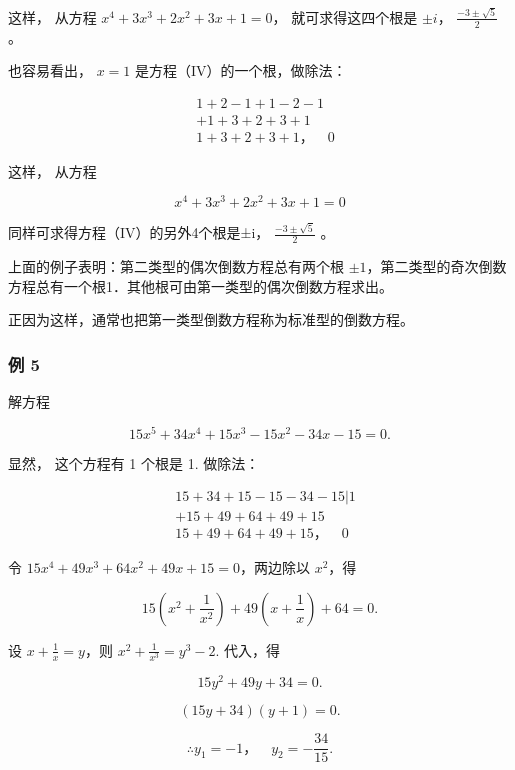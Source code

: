 这样， 从方程 \(x^{4} + 3x^{3} + 2x^{2} + 3x + 1 = 0\)，
就可求得这四个根是 \(\pm i\)， \(\frac{-3 \pm \sqrt{5}}{2}\)。

也容易看出， \(x = 1\) 是方程（IV）的一个根，做除法：

\[
\begin{array}{rl} & 1 + 2 - 1 + 1 - 2 - 1 \\ & + 1 + 3 + 2 + 3 + 1 \\ \hline {} & 1 + 3 + 2 + 3 + 1\text{，} \quad 0 \end{array}
\]

这样， 从方程

\[
x ^ {4} + 3 x ^ {3} + 2 x ^ {2} + 3 x + 1 = 0
\]

同样可求得方程（IV）的另外4个根是±i， \(\frac{-3\pm\sqrt{5}}{2}\) 。

上面的例子表明：第二类型的偶次倒数方程总有两个根
\(\pm 1\)，第二类型的奇次倒数方程总有一个根1．其他根可由第一类型的偶次倒数方程求出。

正因为这样，通常也把第一类型倒数方程称为标准型的倒数方程。

\subsubsection{例 5}

解方程

\[
15 x ^ {5} + 34 x ^ {4} + 15 x ^ {3} - 15 x ^ {2} - 34 x - 15 = 0.
\]

 显然， 这个方程有 1 个根是 1. 做除法：

\[
\begin{array}{rl} & 15 + 34 + 15 - 15 - 34 - 15 | 1 \\ & + 15 + 49 + 64 + 49 + 15 \\ \hline {} & 15 + 49 + 64 + 49 + 15\text{，} \quad 0 \end{array}
\]

令 \(15x^{4} + 49x^{3} + 64x^{2} + 49x + 15 = 0\)，两边除以
\(x^{2}\)，得

\[
15 \left(x ^ {2} + \frac {1}{x ^ {2}}\right) + 49 \left(x + \frac {1}{x}\right) + 64 = 0.
\]

设 \(x + \frac{1}{x} = y\)，则 \(x^{2} + \frac{1}{x^{3}} = y^{3} - 2.\)
代入，得

\[
15 y ^ {2} + 49 y + 34 = 0.
\]

\[
(15 y + 34) (y + 1) = 0.
\]

\[
\therefore y _ {1} = - 1\text{，} \quad y _ {2} = - \frac {34}{15}.
\]

